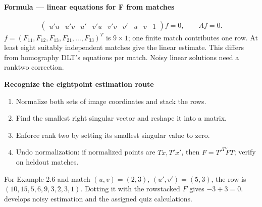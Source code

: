 \documentclass[letterpaper,11pt,english,openany,oneside]{jupyterBook}
\begin{document}
\begin{TextbookBox}
\textbf{Formula — linear equations for F from matches}\par\smallskip
\begin{equation}\label{equation:lectures/lecture02/two-view:eq-lec02-eightpoint}
\begin{split}\begin{pmatrix}u'u&u'v&u'&v'u&v'v&v'&u&v&1\end{pmatrix}f=0,
\qquad Af=0.\end{split}
\end{equation}
\sphinxAtStartPar
\(f=(F_{11},F_{12},F_{13},F_{21},\ldots,F_{33})^T\) is \(9\times1\); one finite match contributes one row. At least eight suitably independent matches give the linear estimate. This differs from homography DLT’s  equations per match. Noisy linear solutions need a rank\sphinxhyphen{}two correction.

\end{TextbookBox}

\begin{TextbookBox}
\textbf{Recognize the eight\sphinxhyphen{}point estimation route}\par\smallskip
\begin{enumerate}
%
\item {}
\sphinxAtStartPar
Normalize both sets of image coordinates and stack the rows.

\item {}
\sphinxAtStartPar
Find the smallest right singular vector and reshape it into a matrix.

\item {}
\sphinxAtStartPar
Enforce rank two by setting its smallest singular value to zero.

\item {}
\sphinxAtStartPar
Undo normalization: if normalized points are \(Tx,T'x'\), then \(F=T'^T\widetilde F T\); verify on held\sphinxhyphen{}out matches.

\end{enumerate}

\sphinxAtStartPar
For Example 2.6 and match \((u,v)=(2,3)\), \((u',v')=(5,3)\), the row is \((10,15,5,6,9,3,2,3,1)\). Dotting it with the row\sphinxhyphen{}stacked \(F\) gives \(-3+3=0\). {\hyperref[\detokenize{lectures/lecture04/estimation::doc}]{}} develops noisy estimation and the assigned quiz calculations.

\end{TextbookBox}
\end{document}
